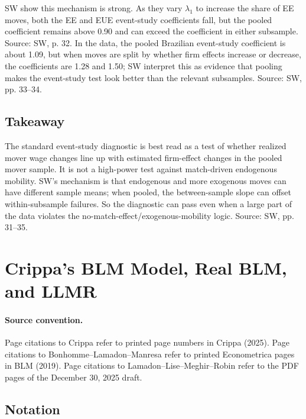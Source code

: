 \documentclass[11pt]{article}
\begin{document}
SW show this mechanism is strong. As they vary $\lambda_1$ to increase the share
of EE moves, both the EE and EUE event-study coefficients fall, but the pooled
coefficient remains above 0.90 and can exceed the coefficient in either subsample.
Source: SW, p. 32. In the data, the pooled Brazilian event-study coefficient is
about 1.09, but when moves are split by whether firm effects increase or decrease,
the coefficients are 1.28 and 1.50; SW interpret this as evidence that pooling makes
the event-study test look better than the relevant subsamples. Source: SW, pp.
33--34.

\subsection{Takeaway}

The standard event-study diagnostic is best read as a test of whether realized mover
wage changes line up with estimated firm-effect changes in the pooled mover sample.
It is not a high-power test against match-driven endogenous mobility. SW's
mechanism is that endogenous and more exogenous moves can have different sample
means; when pooled, the between-sample slope can offset within-subsample failures.
So the diagnostic can pass even when a large part of the data violates the
no-match-effect/exogenous-mobility logic. Source: SW, pp. 31--35.

\section{Crippa's BLM Model, Real BLM, and LLMR}

\paragraph{Source convention.}
Page citations to Crippa refer to printed page numbers in Crippa (2025). Page
citations to Bonhomme--Lamadon--Manresa refer to printed Econometrica pages in
BLM (2019). Page citations to Lamadon--Lise--Meghir--Robin refer to the PDF
pages of the December 30, 2025 draft.

\subsection{Notation}
\end{document}
